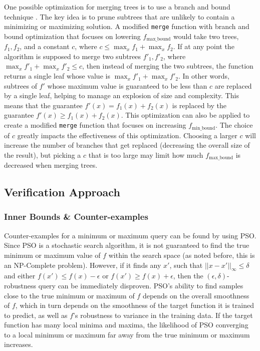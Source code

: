 \documentclass[pageno]{jpaper}
\newcommand{\fminb}{f_{\textrm{min\_bound}}}
\newcommand{\fmaxb}{f_{\textrm{max\_bound}}}
\begin{document}
\begin{doublespacing}
One possible optimization for merging trees is to use a branch and bound technique \cite{clausen}. The key idea is to prune subtrees that are unlikely to contain a minimizing or maximizing solution. A modified \verb|merge| function with branch and bound optimization that focuses on lowering $\fmaxb$ would take two trees, $f_1, f_2$, and a constant $c$, where $c \le \max_x f_1 + \max_x f_2$. If at any point the algorithm is supposed to merge two subtrees $f'_1, f'_2$, where $\max_x f'_1 + \max_x f'_2 \le c$, then instead of merging the two subtrees, the function returns a single leaf whose value is $\max_x f'_1 + \max_x f'_2$. In other words, subtrees of $f'$ whose maximum value is guaranteed to be less than $c$ are replaced by a single leaf, helping to manage an explosion of size and complexity. This means that the guarantee $f'(x) = f_1(x) + f_2(x)$ is replaced by the guarantee $f'(x) \ge f_1 (x) + f_2 (x)$. This optimization can also be applied to create a modified \verb|merge| function that focuses on increasing $\fminb$. The choice of $c$ greatly impacts the effectiveness of this optimization. Choosing a larger $c$ will increase the number of branches that get replaced (decreasing the overall size of the result), but picking a $c$ that is too large may limit how much $\fmaxb$ is decreased when merging trees.

\subsection{Verification Approach}
\label{sec:approach}
\subsubsection{Inner Bounds \& Counter-examples}
Counter-examples for a minimum or maximum query can be found by using PSO. Since PSO is a stochastic search algorithm, it is not guaranteed to find the true minimum or maximum value of $f$ within the search space (as noted before, this is an NP-Complete problem). However, if it finds any $x'$, such that $||x - x'||_\infty \le \delta$ and either $f(x') \le f(x) - \epsilon$ or $f(x') \ge f(x) + \epsilon$, then the $(\epsilon, \delta)$-robustness query can be immediately disproven. PSO's ability to find samples close to the true minimum or maximum of $f$ depends on the overall smoothness of $f$, which in turn depends on the smoothness of the target function it is trained to predict, as well as $f$'s robustness to variance in the training data. If the target function has many local minima and maxima, the likelihood of PSO converging to a local minimum or maximum far away from the true minimum or maximum increases.


\end{doublespacing}
\end{document}
